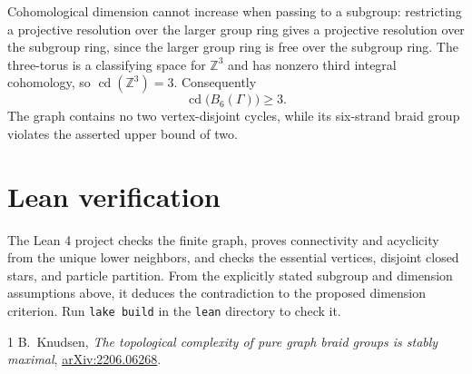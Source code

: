 \documentclass[10pt]{article}
\begin{document}
Cohomological dimension cannot increase when passing to a subgroup:
restricting a projective resolution over the larger group ring gives a
projective resolution over the subgroup ring, since the larger group
ring is free over the subgroup ring. The three-torus is a classifying
space for $\mathbb Z^3$ and has nonzero third integral cohomology, so
$\operatorname{cd}(\mathbb Z^3)=3$. Consequently
\[
 \operatorname{cd}\bigl(B_6(\Gamma)\bigr)\ge3.
\]
The graph contains no two vertex-disjoint cycles, while its six-strand
braid group violates the asserted upper bound of two.

\section*{Lean verification}

The Lean 4 project checks the finite graph, proves connectivity and
acyclicity from the unique lower neighbors, and checks the essential
vertices, disjoint closed stars, and particle partition. From the
explicitly stated subgroup and dimension assumptions above, it deduces
the contradiction to the proposed dimension criterion. Run
\texttt{lake build} in the \texttt{lean} directory to check it.

\begin{thebibliography}{1}
B.~Knudsen, \emph{The topological complexity of pure graph braid groups is
stably maximal}, \href{https://arxiv.org/abs/2206.06268}{arXiv:2206.06268}.
\end{thebibliography}
\end{document}
